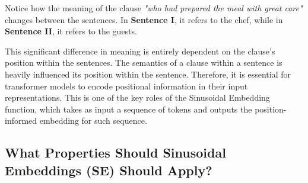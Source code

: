 \documentclass{article}
\begin{document}
Notice how the meaning of the clause \textit{"who had prepared the meal with great care"} changes between the sentences. In \textbf{Sentence I}, it refers to the chef, while in \textbf{Sentence II}, it refers to the guests.

This significant difference in meaning is entirely dependent on the clause's position within the sentences. The semantics of a clause within a sentence is heavily influenced its position within the sentence. Therefore, it is essential for transformer models to encode positional information in their input representations. This is one of the key roles of the Sinusoidal Embedding function, which takes as input a sequence of tokens and outputs the position-informed embedding for such sequence.



\subsection{What Properties Should Sinusoidal Embeddings (SE) Should Apply?}
\end{document}
